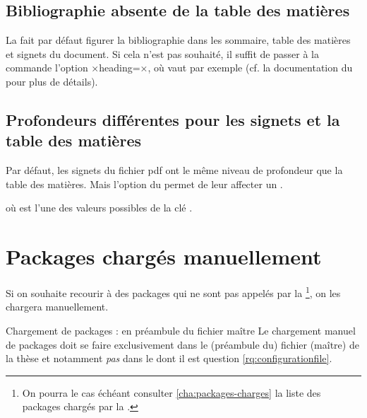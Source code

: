 
\subsection{Bibliographie absente de la table des matières}

La \yatcl{} fait par défaut figurer la bibliographie dans les sommaire, table
des matières et signets du document. Si cela n'est pas souhaité, il suffit de
passer à la commande  l'option
×heading=×, où  vaut par exemple
 (cf. la documentation du  pour plus
de détails).

\subsection{Profondeurs différentes pour les signets et la table des matières}

Par défaut, les signets du fichier \acrshort{pdf} ont le même niveau de
profondeur que la table des matières. Mais l'option 
du  permet de leur affecter un .
\begin{preamblecode}[title=Par exemple dans le \File{\configurationfile}]
\end{preamblecode}
où  est l'une des valeurs possibles de la clé
.

\section{Packages chargés manuellement}
\label{sec:options-de-classes}
Si on souhaite recourir à des packages qui ne sont pas appelés par la
\yatcl{}\footnote{On pourra le cas échéant consulter
  \vref{cha:packages-charges} la liste des packages chargés par la \yatcl{}.},
on les chargera manuellement.

\begin{dbwarning}{Chargement de packages : en préambule du fichier maître}{}
  Le chargement manuel de packages doit se faire exclusivement dans le
  (préambule du) fichier (maître) de la thèse et notamment \emph{pas} dans le
  \File{\configurationfile} dont il est question
  \vref{rq:configurationfile}.
\end{dbwarning}

%
\iffalse
\fi
